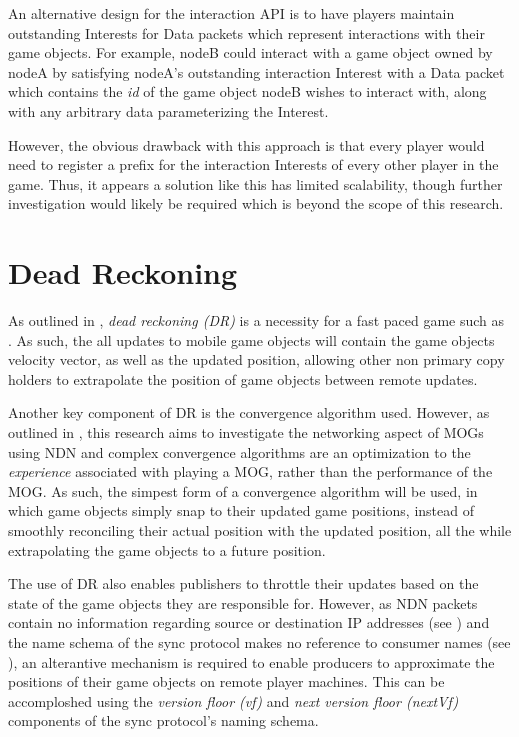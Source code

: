 An alternative design for the interaction API is to have players maintain outstanding Interests for Data packets which represent interactions with their game objects. For example, nodeB could interact with a game object owned by nodeA by satisfying nodeA's outstanding interaction Interest with a Data packet which contains the \textit{id} of the game object nodeB wishes to interact with, along with any arbitrary data parameterizing the Interest. 

However, the obvious drawback with this approach is that every player would need to register a prefix for the interaction Interests of every other player in the game. Thus, it appears a solution like this has limited scalability, though further investigation would likely be required which is beyond the scope of this research. 



\section{Dead Reckoning}\label{sec:des:dr}
As outlined in , \textit{dead reckoning (DR)} is a necessity for a fast paced game such as \game{}. As such, the all updates to mobile game objects will contain the game objects velocity vector, as well as the updated position, allowing other non primary copy holders to extrapolate the position of game objects between remote updates.

Another key component of DR is the convergence algorithm used. However, as outlined in , this research aims to investigate the networking aspect of MOGs using NDN and complex convergence algorithms are an optimization to the \textit{experience} associated with playing a MOG, rather than the performance of the MOG. As such, the simpest form of a convergence algorithm will be used, in which game objects simply snap to their updated game positions, instead of smoothly reconciling their actual position with the updated position, all the while extrapolating the game objects to a future position.

The use of DR also enables publishers to throttle their updates based on the state of the game objects they are responsible for. However, as NDN packets contain no information regarding source or destination IP addresses (see ) and the name schema of the sync protocol makes no reference to consumer names (see ), an alterantive mechanism is required to enable producers to approximate the positions of their game objects on remote player machines. This can be accomploshed using the \textit{version floor (vf)} and \textit{next version floor (nextVf)} components of the sync protocol's naming schema.

